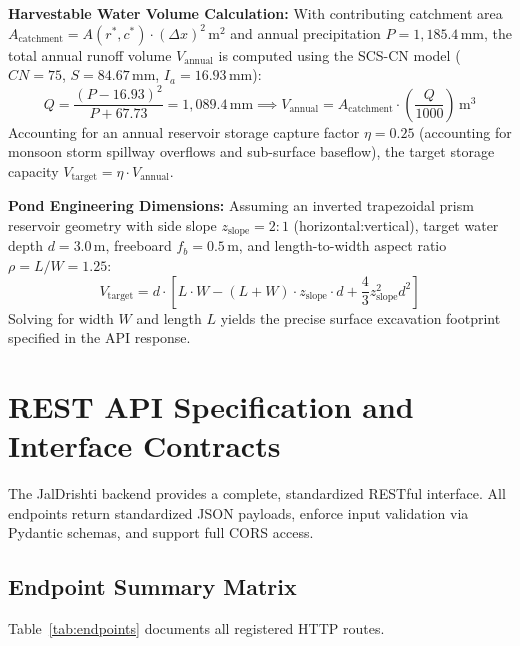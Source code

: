 \documentclass[11pt,a4paper]{article}
\begin{document}
\textbf{Harvestable Water Volume Calculation:} With contributing catchment area $A_{\text{catchment}} = A(r^*, c^*) \cdot (\Delta x)^2\,\text{m}^2$ and annual precipitation $P = 1,185.4\,\text{mm}$, the total annual runoff volume $V_{\text{annual}}$ is computed using the SCS-CN model ($CN = 75$, $S = 84.67\,\text{mm}$, $I_a = 16.93\,\text{mm}$):
\begin{equation}
Q = \frac{(P - 16.93)^2}{P + 67.73} = 1,089.4\,\text{mm} \implies V_{\text{annual}} = A_{\text{catchment}} \cdot \left(\frac{Q}{1000}\right)\,\text{m}^3
\label{eq:volume_calc}
\end{equation}
Accounting for an annual reservoir storage capture factor $\eta = 0.25$ (accounting for monsoon storm spillway overflows and sub-surface baseflow), the target storage capacity $V_{\text{target}} = \eta \cdot V_{\text{annual}}$.

\textbf{Pond Engineering Dimensions:} Assuming an inverted trapezoidal prism reservoir geometry with side slope $z_{\text{slope}} = 2:1$ (horizontal:vertical), target water depth $d = 3.0\,\text{m}$, freeboard $f_b = 0.5\,\text{m}$, and length-to-width aspect ratio $\rho = L/W = 1.25$:
\begin{equation}
V_{\text{target}} = d \cdot \left[ L \cdot W - (L + W) \cdot z_{\text{slope}} \cdot d + \frac{4}{3} z_{\text{slope}}^2 d^2 \right]
\label{eq:pond_prism}
\end{equation}
Solving for width $W$ and length $L$ yields the precise surface excavation footprint specified in the API response.

\section{REST API Specification and Interface Contracts}
\label{sec:api}

The JalDrishti backend provides a complete, standardized RESTful interface. All endpoints return standardized JSON payloads, enforce input validation via Pydantic schemas, and support full CORS access.

\subsection{Endpoint Summary Matrix}
Table~\ref{tab:endpoints} documents all registered HTTP routes.
\end{document}
